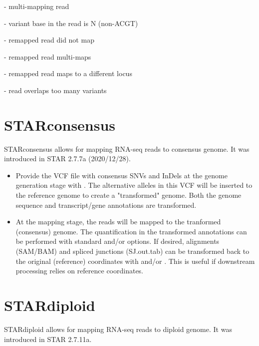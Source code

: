 \documentclass[12pt]{article}
\begin{document}
 - multi-mapping read

 - variant base in the read is N (non-ACGT)

 - remapped read did not map

 - remapped read multi-maps

 - remapped read maps to a different locus

 - read overlaps too many variants

\section{STARconsensus}
STARconsensus allows for mapping RNA-seq reads to consensus genome. It was introduced in STAR 2{.}7{.}7a (2020/12/28).

\begin{itemize}
\item
Provide the VCF file with consensus SNVs and InDels at the genome generation stage with      .
The alternative alleles in this VCF will be inserted to the reference genome to create a "transformed" genome.
Both the genome sequence and transcript/gene annotations are transformed.

\item
At the mapping stage, the reads will be mapped to the tranformed (consensus) genome.
The quantification in the transformed annotations can be performed with standard   and/or  options.
If desired, alignments (SAM/BAM) and spliced junctions (SJ.out.tab) can be transformed back to the original (reference) coordinates with   and/or .
This is useful if downstream processing relies on reference coordinates.
\end{itemize}

\section{STARdiploid}
STARdiploid allows for mapping RNA-seq reads to diploid genome. It was introduced in STAR 2{.}7{.}11a.
\end{document}
